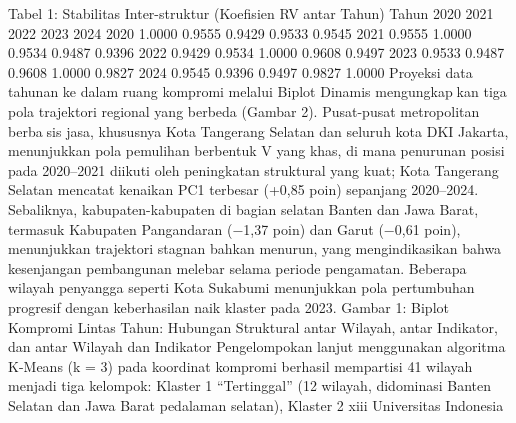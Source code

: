 Tabel 1: Stabilitas Inter-struktur (Koefisien RV antar Tahun)
Tahun 2020 2021 2022 2023 2024
2020 1.0000 0.9555 0.9429 0.9533 0.9545
2021 0.9555 1.0000 0.9534 0.9487 0.9396
2022 0.9429 0.9534 1.0000 0.9608 0.9497
2023 0.9533 0.9487 0.9608 1.0000 0.9827
2024 0.9545 0.9396 0.9497 0.9827 1.0000
Proyeksi data tahunan ke dalam ruang kompromi melalui Biplot Dinamis mengungkapkan tiga pola trajektori regional yang berbeda (Gambar 2). Pusat-pusat metropolitan berbasis jasa, khususnya Kota Tangerang Selatan dan seluruh kota DKI Jakarta, menunjukkan
pola pemulihan berbentuk V yang khas, di mana penurunan posisi pada 2020–2021 diikuti
oleh peningkatan struktural yang kuat; Kota Tangerang Selatan mencatat kenaikan PC1
terbesar (+0,85 poin) sepanjang 2020–2024. Sebaliknya, kabupaten-kabupaten di bagian
selatan Banten dan Jawa Barat, termasuk Kabupaten Pangandaran (−1,37 poin) dan Garut
(−0,61 poin), menunjukkan trajektori stagnan bahkan menurun, yang mengindikasikan
bahwa kesenjangan pembangunan melebar selama periode pengamatan. Beberapa wilayah
penyangga seperti Kota Sukabumi menunjukkan pola pertumbuhan progresif dengan
keberhasilan naik klaster pada 2023.
Gambar 1: Biplot Kompromi Lintas Tahun: Hubungan Struktural antar Wilayah, antar
Indikator, dan antar Wilayah dan Indikator
Pengelompokan lanjut menggunakan algoritma K-Means (k = 3) pada koordinat
kompromi berhasil mempartisi 41 wilayah menjadi tiga kelompok: Klaster 1 “Tertinggal”
(12 wilayah, didominasi Banten Selatan dan Jawa Barat pedalaman selatan), Klaster 2
xiii Universitas Indonesia

